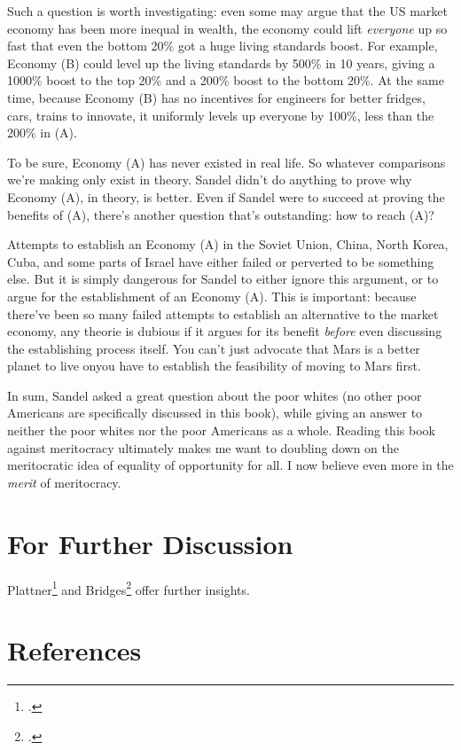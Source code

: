 \documentclass[12pt]{article}
\begin{document}
Such a question is worth investigating: even some may argue that the US market economy has been more inequal in wealth, the economy could lift \emph{everyone} up so fast that even the bottom 20\% got a huge living standards boost. For example, Economy (B) could level up the living standards by 500\% in 10 years, giving a 1000\% boost to the top 20\% and a 200\% boost to the bottom 20\%. At the same time, because Economy (B) has no incentives for engineers for better fridges, cars, trains to innovate, it uniformly levels up everyone by 100\%, less than the 200\% in (A). 

To be sure, Economy (A) has never existed in real life. So whatever comparisons we're making only exist in theory. Sandel didn't do anything to prove why Economy (A), in theory, is better. Even if Sandel were to succeed at proving the benefits of (A), there's another question that's outstanding: how to reach (A)?

Attempts to establish an Economy (A) in the Soviet Union, China, North Korea, Cuba, and some parts of Israel have either failed or perverted to be something else. But it is simply dangerous for Sandel to either ignore this argument, or to argue for the establishment of an Economy (A). This is important: because there've been so many failed attempts to establish an alternative to the market economy, any theorie is dubious if it argues for its benefit \emph{before} even discussing the establishing process itself. You can't just advocate that Mars is a better planet to live on\textemdash{}you have to establish the feasibility of moving to Mars first.

In sum, Sandel asked a great question about the poor whites (no other poor Americans are specifically discussed in this book), while giving an answer to neither the poor whites nor the poor Americans as a whole. Reading this book against meritocracy ultimately makes me want to doubling down on the meritocratic idea of equality of opportunity for all. I now believe even more in the \emph{merit} of meritocracy.

\section{For Further Discussion}

Plattner\footcite{plattnerTyrannyMeritWhats2021} and Bridges\footcite{bridgesTYRANNYRACEBLINDNESS2021} offer further insights.

\section{References}

\printbibliography[heading=none]

\end{document}

